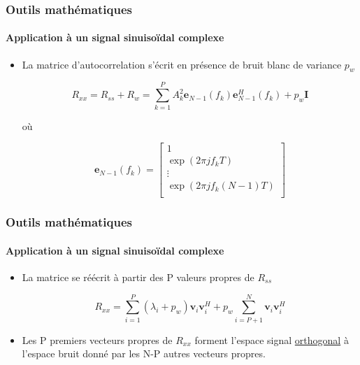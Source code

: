 \documentclass[10pt]{beamer}
\begin{document}
\begin{frame}

\frametitle{Outils mathématiques}
\framesubtitle{Application à un signal sinuisoïdal complexe}

\begin{itemize}
  
  \item La matrice d'autocorrelation s'écrit en présence de bruit blanc de variance \(p_w\)
  
  \begin{equation}
%
\label{eq:Ryy}
R_{xx}= R_{ss} + R_w =\sum_{k=1}^{P}A_k^2 \boldsymbol{e}_{N-1}(f_k) \boldsymbol{e}_{N-1}^H(f_k) + p_w\boldsymbol{I}
%
\end{equation}

où

\begin{equation}
%
\label{eq:em}
\boldsymbol{e}_{N-1}(f_k)=\begin{bmatrix}
1 \\
\exp (2 \pi j f_k T) \\
\vdots \\
\exp (2 \pi j f_k (N-1)T) \\
\end{bmatrix}
%
\end{equation}


\end{itemize}
\end{frame}


\begin{frame}

\frametitle{Outils mathématiques}
\framesubtitle{Application à un signal sinuisoïdal complexe}

\begin{itemize}
  \item La matrice se réécrit à partir des P valeurs propres de \(R_{ss}\)
  
  \begin{equation}
%
\label{eq:RyyEigen}
R_{xx} = \sum_{i=1}^{P}(\lambda _i + p_w) \boldsymbol{v}_{i} \boldsymbol{v}_{i}^H + p_w\sum_{i=P+1}^{N} \boldsymbol{v}_{i} \boldsymbol{v}_{i}^H
%
\end{equation}

\item Les P premiers vecteurs propres de \(R_{xx}\) forment l'espace signal \underline {orthogonal} à l'espace bruit donné par les N-P autres vecteurs propres.

\end{itemize}
\end{frame}
\end{document}
